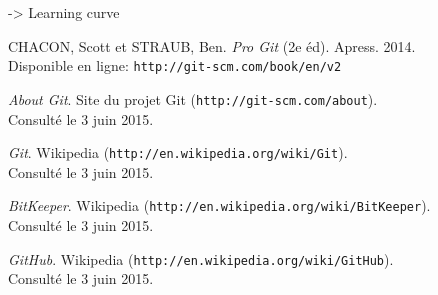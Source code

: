 \documentclass[11pt,a4paper]{article}
\begin{document}
-> Learning curve

\pagebreak
{}

\begin{thebibliography}{1}

	CHACON, Scott et STRAUB, Ben. {\em Pro Git} (2e éd). Apress. 2014. \\
	Disponible en ligne: {\tt http://git-scm.com/book/en/v2}

	{\em About Git}. Site du projet Git ({\tt http://git-scm.com/about}). \\
	Consulté le 3 juin 2015.

	{\em Git}. Wikipedia ({\tt http://en.wikipedia.org/wiki/Git}). \\
	Consulté le 3 juin 2015.

	{\em BitKeeper}. Wikipedia ({\tt http://en.wikipedia.org/wiki/BitKeeper}). \\
	Consulté le 3 juin 2015.

	{\em GitHub}. Wikipedia ({\tt http://en.wikipedia.org/wiki/GitHub}). \\
	Consulté le 3 juin 2015.
	
\end{thebibliography}
\end{document}
